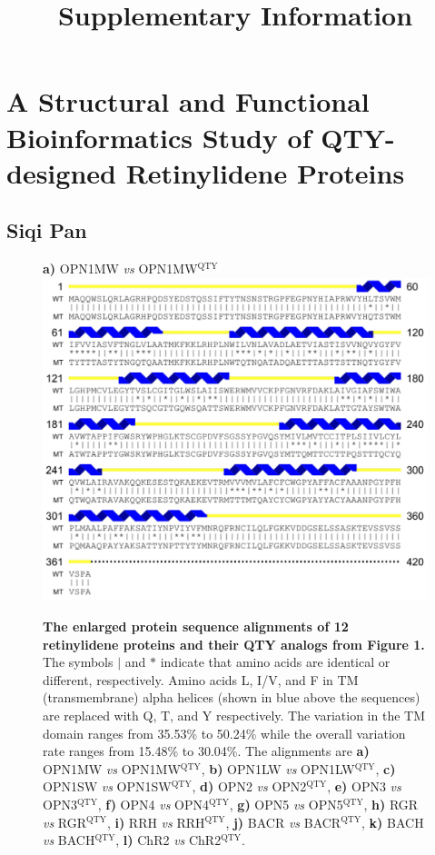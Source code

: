 \documentclass[fleqn,12pt]{supp}
\title{Supplementary Information}
\author{}
\begin{document}
\flushbottom
\maketitle

\vspace{-35pt}
\section*{A Structural and Functional Bioinformatics Study of QTY-designed Retinylidene Proteins}

\subsection*{Siqi Pan}

 

\begin{figure}[H]
    \caption{\textbf{The enlarged protein sequence alignments of 12 retinylidene proteins and their QTY analogs from Figure 1. } The symbols $|$ and $*$ indicate that amino acids are identical or different, respectively. Amino acids L, I/V, and F in TM (transmembrane) alpha helices (shown in blue above the sequences) are replaced with Q, T, and Y respectively. The variation in the TM domain ranges from 35.53\% to 50.24\% while the overall variation rate ranges from 15.48\% to 30.04\%. 
    The alignments are 
    \textbf{a)} OPN1MW \textit{vs} OPN1MW$^{\textrm{QTY}}$, 
    \textbf{b)} OPN1LW \textit{vs} OPN1LW$^{\textrm{QTY}}$, 
    \textbf{c)} OPN1SW \textit{vs} OPN1SW$^{\textrm{QTY}}$, 
    \textbf{d)} OPN2 \textit{vs} OPN2$^{\textrm{QTY}}$, 
    \textbf{e)} OPN3 \textit{vs} OPN3$^{\textrm{QTY}}$, 
    \textbf{f)} OPN4 \textit{vs} OPN4$^{\textrm{QTY}}$, 
    \textbf{g)} OPN5 \textit{vs} OPN5$^{\textrm{QTY}}$, 
    \textbf{h)} RGR \textit{vs} RGR$^{\textrm{QTY}}$, 
    \textbf{i)} RRH \textit{vs} RRH$^{\textrm{QTY}}$, 
    \textbf{j)} BACR \textit{vs} BACR$^{\textrm{QTY}}$, 
    \textbf{k)} BACH \textit{vs} BACH$^{\textrm{QTY}}$, 
    \textbf{l)} ChR2 \textit{vs} ChR2$^{\textrm{QTY}}$. }
    \textbf{a)} OPN1MW \textit{vs} OPN1MW$^{\textrm{QTY}}$ \\
    \includegraphics[width=\linewidth]{SuppFigures/opn1mw.jpg}

\end{figure}
\end{document}
